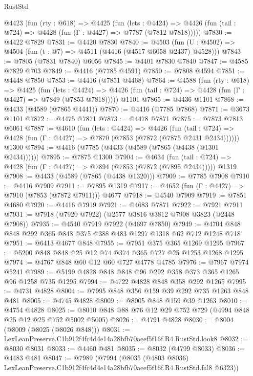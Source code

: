 \begin{lexlean}{RustStd}
\begin{coremodule}
  @4423
    (fun (rty : @618) =>
    @4425
      (fun (lets : @4424) =>
      @4426 (fun (tail : @724) => @4428 (fun (Γ : @4427) => @7787 (@7812 @7818)))))
@7830 := @4422 @7829
@7831 := @4420 @7830
@7840 := @4503 (fun (U : @4502) => @4504 (fun (t : @7) => @4511 (@4416 (@4517 @6058 @2437) @4528)))
@7843 := @7805 (@7831 @7840) @6056
@7845 := @4401 @7830 @7840
@7847 := @4585 @7829 @703
@7849 := @4416 (@7785 @4591)
@7850 := @7808 @4594
@7851 := @4448 @7850
@7853 := @4416 (@7851 @4468)
@7864 := @4588
    (fun (rty : @618) =>
    @4425
      (fun (lets : @4424) =>
      @4426 (fun (tail : @724) => @4428 (fun (Γ : @4427) => @7849 (@7853 @7818)))))
    @1101
@7865 := @4436 @1101
@7868 := @4433 (@4589 (@7865 @4441))
@7870 := @4416 (@7785 @7868)
@7871 := @3673 @1101
@7872 := @4475 @7871
@7873 := @4478 @7871
@7875 := @7873 @7813 @6061
@7887 := @4610
    (fun (lets : @4424) =>
    @4426
      (fun (tail : @724) => @4428 (fun (Γ : @4427) => @7870 (@7853 (@7872 (@7875 @2431 @2434))))))
    @1300
@7894 := @4416 (@7785 (@4433 (@4589 (@7865 (@4438 (@1301 @2434))))))
@7895 := @7875 @1300
@7904 := @4634
    (fun (tail : @724) => @4428 (fun (Γ : @4427) => @7894 (@7853 (@7872 (@7895 @2434)))))
    @1319
@7908 := @4433 (@4589 (@7865 (@4438 @1320)))
@7909 := @7785 @7908
@7910 := @4416 @7909
@7911 := @7895 @1319
@7917 := @4652 (fun (Γ : @4427) => @7910 (@7853 (@7872 @7911))) @4677
@7918 := @4540 @7909
@7919 := @7851 @4680
@7920 := @4416 @7919
@7921 := @4683 @7871
@7922 := @7921 @7911
@7931 := @7918 (@7920 @7922) (@2577 @3816 @3812 @7908 @3823 (@2448 @7908))
@7935 := @4540 @7919 @7922 (@4697 @7850)
@7949 := @4704 @848 @848 @292 @365 @848 @375 @388 @483 @1297 @1318 @62 @712 @1248 @718
@7951 := @6413 @4677 @848
@7955 := @7951 @375 @365 @1269 @1295
@7967 := @5200 @848 @848 @25 @12 @74 @374 @365 @727 @25 @1253 @1268 @1295
@7974 := @4767 @848 @60 @12 @60 @727 @4778 @4785
@7976 := @7967 @7974 @5241
@7989 := @5199 @4828 @848 @848 @96 @292 @358 @373 @365 @1265 @96 @1258 @735 @1295
@7994 := @4722 @4828 @848 @358 @292 @1265
@7995 := @4731 @4828
@8004 := @7995 @848 @356 @159 @39 @292 @735 @1263 @848 @481
@8005 := @4745 @4828
@8009 := @8005 @848 @159 @39 @1263
@8010 := @4754 @4828
@8025 := @8010 @848 @88 @76 @12 @29 @752 @729 (@4994 @848 @25 @12 @25 @752 @5002 @5005)
@8026 := @4791 @4828
@8030 := @8004 (@8009 (@8025 (@8026 @848)))
@8031 := LexLeanPreserve.C1b912f4fc4d4e14a28bfb70aeef5f16f.R4.RustStd.look8
@8032 := @8030 @8031
@8033 := @4460 @481
@8035 := @8032 (@4799 @8033)
@8036 := @4483 @481
@8047 := @7989
    (@7994
      (@8035 (@4803 @8036) LexLeanPreserve.C1b912f4fc4d4e14a28bfb70aeef5f16f.R4.RustStd.fal8 @6323))

\end{coremodule}
\end{lexlean}
